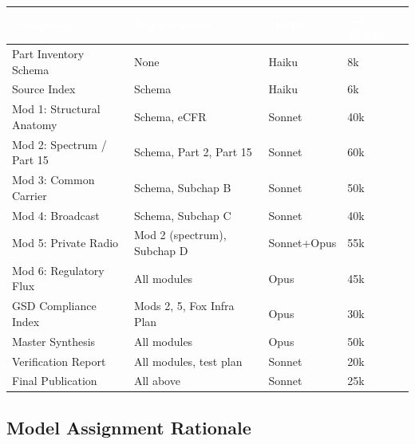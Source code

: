 \documentclass[11pt,letterpaper]{article}
\newcommand{\tableheader}[1]{\textbf{\sffamily\textcolor{white}{#1}}}
\begin{document}
\begin{center}
\begin{tabularx}{\textwidth}{L{3.5cm}L{3cm}C{2cm}C{2cm}}
\toprule
{}
\tableheader{Component} & \tableheader{Dependencies} & \tableheader{Model} & \tableheader{Est. Tokens} \\
\midrule
Part Inventory Schema & None & Haiku & 8k \\
Source Index & Schema & Haiku & 6k \\
Mod 1: Structural Anatomy & Schema, eCFR & Sonnet & 40k \\
Mod 2: Spectrum / Part 15 & Schema, Part 2, Part 15 & Sonnet & 60k \\
Mod 3: Common Carrier & Schema, Subchap B & Sonnet & 50k \\
Mod 4: Broadcast & Schema, Subchap C & Sonnet & 40k \\
Mod 5: Private Radio & Mod 2 (spectrum), Subchap D & Sonnet+Opus & 55k \\
Mod 6: Regulatory Flux & All modules & Opus & 45k \\
GSD Compliance Index & Mods 2, 5, Fox Infra Plan & Opus & 30k \\
Master Synthesis & All modules & Opus & 50k \\
Verification Report & All modules, test plan & Sonnet & 20k \\
Final Publication & All above & Sonnet & 25k \\
\bottomrule
\end{tabularx}
\end{center}

\subsection{Model Assignment Rationale}
\end{document}
